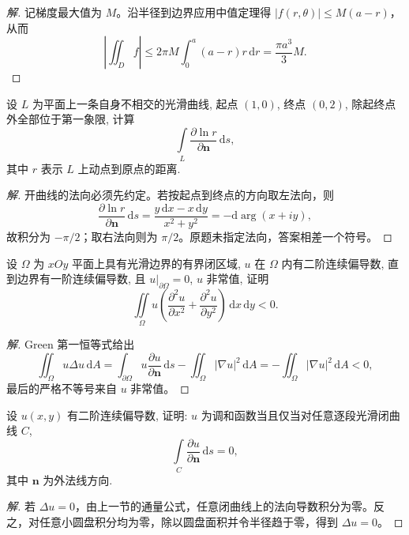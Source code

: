 \documentclass[../../数学分析培优讲义(答案版).tex]{subfiles}
\begin{document}
\begin{proof}[解]
记梯度最大值为 $M$。沿半径到边界应用中值定理得 $|f(r,\theta)|\leq M(a-r)$，从而
\[
\left|\iint_Df\right|\leq2\pi M\int_0^a(a-r)r\,\mathrm{d}r=\dfrac{\pi a^3}{3}M.
\]
\end{proof}


\begin{example}
设 $L$ 为平面上一条自身不相交的光滑曲线, 起点 $(1,0)$, 终点 $(0,2)$, 除起终点外全部位于第一象限, 计算
\[
    \int\limits_L\dfrac{\partial\ln r}{\partial\bm n}\,\mathrm{d}s,
\]
其中 $r$ 表示 $L$ 上动点到原点的距离.
\end{example}

\begin{proof}[解]
开曲线的法向必须先约定。若按起点到终点的方向取左法向，则
\[
\dfrac{\partial\ln r}{\partial\bm n}\,\mathrm{d}s
=\dfrac{y\,\mathrm{d}x-x\,\mathrm{d}y}{x^2+y^2}=-\mathrm{d}\arg(x+iy),
\]
故积分为 $-\pi/2$；取右法向则为 $\pi/2$。原题未指定法向，答案相差一个符号。
\end{proof}

\begin{example}
设 $\Omega$ 为 $xOy$ 平面上具有光滑边界的有界闭区域, $u$ 在 $\Omega$ 内有二阶连续偏导数, 直到边界有一阶连续偏导数, 且 $u|_{\partial\Omega}=0$, $u$ 非常值, 证明
\[
    \iint\limits_\Omega u\left(\dfrac{\partial^2u}{\partial x^2}+\dfrac{\partial^2u}{\partial y^2}\right)\,\mathrm{d}x\,\mathrm{d}y<0.
\]
\end{example}

\begin{proof}[解]
Green 第一恒等式给出
\[
\iint_\Omega u\Delta u\,\mathrm{d}A
=\int_{\partial\Omega}u\dfrac{\partial u}{\partial\bm n}\,\mathrm{d}s
-\iint_\Omega|\nabla u|^2\,\mathrm{d}A
=-\iint_\Omega|\nabla u|^2\,\mathrm{d}A<0,
\]
最后的严格不等号来自 $u$ 非常值。
\end{proof}

\begin{example}
设 $u(x,y)$ 有二阶连续偏导数, 证明: $u$ 为调和函数当且仅当对任意逐段光滑闭曲线 $C$,
\[
    \int\limits_C\dfrac{\partial u}{\partial\bm n}\,\mathrm{d}s=0,
\]
其中 $\bm n$ 为外法线方向.
\end{example}

\begin{proof}[解]
若 $\Delta u=0$，由上一节的通量公式，任意闭曲线上的法向导数积分为零。反之，对任意小圆盘积分均为零，除以圆盘面积并令半径趋于零，得到 $\Delta u=0$。
\end{proof}
\end{document}
